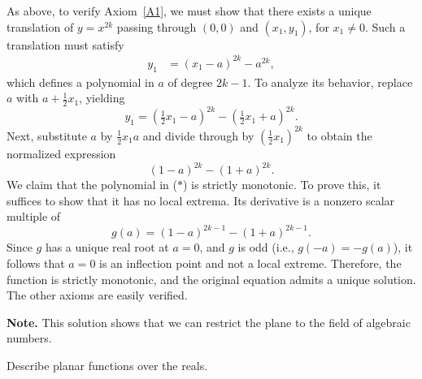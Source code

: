 \begin{solution}
    As above, to verify Axiom~\ref{A1}, we must show that there exists a unique translation of\/ $y = x^{2k}$ passing through\/ $(0,0)$ and\/ $(x_1, y_1)$, for\/ $x_1 \ne 0$. Such a translation must satisfy
\begin{align*}
    y_1 &= (x_1 - a)^{2k} - a^{2k},
\end{align*}
which defines a polynomial in\/ $a$ of degree\/ $2k - 1$. To analyze its behavior, replace\/ $a$ with\/ $a + \tfrac{1}{2}x_1$, yielding
\[
    y_1 = (\tfrac{1}{2}x_1 - a)^{2k} - (\tfrac{1}{2}x_1 + a)^{2k}.
\]
Next, substitute\/ $a$ by\/ $\tfrac{1}{2}x_1 a$ and divide through by\/ $(\tfrac{1}{2}x_1)^{2k}$ to obtain the normalized expression
\begin{equation*}
    (1 - a)^{2k} - (1 + a)^{2k}. \tag{$\ast$}
\end{equation*}
We claim that the polynomial in\/ ($\ast$) is strictly monotonic. To prove this, it suffices to show that it has no local extrema. Its derivative is a nonzero scalar multiple of
\[
    g(a) = (1 - a)^{2k - 1} - (1 + a)^{2k - 1}.
\]
Since\/ $g$ has a unique real root at\/ $a = 0$, and\/ $g$ is odd (i.e., $g(-a) = -g(a)$), it follows that\/ $a = 0$ is an inflection point and not a local extreme. Therefore, the function is strictly monotonic, and the original equation admits a unique solution. The other axioms are easily verified.

\textbf{Note.} This solution shows that we can restrict the plane to the field of algebraic numbers.

\end{solution}

\begin{exr}
     Describe planar functions over the reals.
\end{exr}

